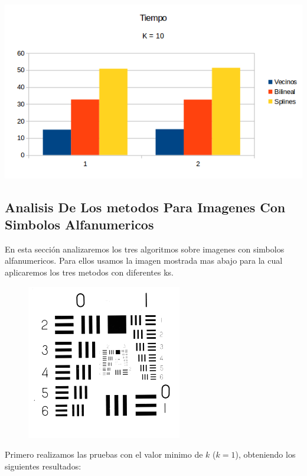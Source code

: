 \begin{center}
\includegraphics[scale=0.50]{imagenes/K10T.png}
\end{center}

\subsection{Analisis De Los metodos Para Imagenes Con Simbolos Alfanumericos}
En esta sección analizaremos los tres algoritmos sobre imagenes con simbolos alfanumericos. Para ellos usamos la imagen mostrada mas abajo para la cual aplicaremos los tres metodos con diferentes ks.

\begin{figure}[H]
\centering
\includegraphics[scale=0.50]{fotos/alfanum/orig.png}
\end{figure}

Primero realizamos las pruebas con el valor minimo de $k$ ($k=1$), obteniendo los siguientes resultados:



